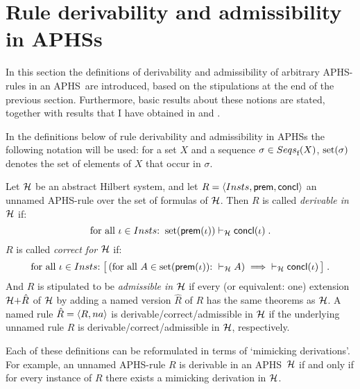\documentclass[envcountsame,runningheads]{llncs}
\newcommand{\pairlft}{{\langle}}
\newcommand{\pairrgt}{{\rangle}}
\newcommand{\pairsep}{{,\,}\nix}
\newcommand{\pairstr}[1]{\pairlft#1\pairrgt}
\newcommand{\pair}[2]{\pairstr{#1\pairsep#2}}
\newcommand{\triple}[2]{\pair{#1\pairsep#2}}
\newcommand{\finseqs}{\funap{{\mit Seqs}_{\text{f}}}}
\newcommand{\aseq}{\sigma}
\newcommand{\nix}{}
\newcommand{\funap}[2]{#1(#2)}
\newcommand{\APHS}{A\hspace*{-0.3pt}P\hspace*{-0.6pt}H\hspace*{-0.4pt}S}
\newcommand{\aAPHS}{{\cal H}}
\newcommand{\extsysbyrule}[2]{{{#1}{+}{#2}}}
\newcommand{\insts}{{\mit Insts}}
\newcommand{\ainst}{\iota}
\newcommand{\aname}{{\mit na}}
\newcommand{\anamedRule}{{\hat{R}}}
\newcommand{\aunnamedRule}{R}
\newcommand{\sprem}{{\sf prem}}
\newcommand{\sconcl}{{\sf concl}}
\newcommand{\prem}{\funap{\sprem}}
\newcommand{\concl}{\funap{\sconcl}}
\newcommand{\aform}{A}
\newcommand{\sconsrel}{\vdash}
\newcommand{\sconsrelH}[1]{{\sconsrel_{#1}}}
\newcommand{\consrelH}[3]{{#2 \mathrel{\sconsrelH{#1}} #3}}
\newcommand{\sset}{\text{\normalfont set}}
\newcommand{\set}{\funap{\sset}}
\begin{document}
\section{Rule derivability and admissibility in \APHS{s}}
  \label{sec:APHSs:results}



In this section the definitions of derivability and admissibility
of arbitrary \APHS-rules in an \APHS\ are introduced,
based on the stipulations at the end of the previous section.
Furthermore, basic results about these notions 
are stated, together with results that I have obtained
in \cite{grab:2003} and \cite{grab:2005}.

In the definitions below of rule derivability and admissibility in \APHS{s}
the following notation will be used:
for a set $X$ and a sequence $\aseq\in\finseqs{X}$, $\set{\aseq}$
denotes the set of elements of $X$ that occur in $\aseq$.

Let $\aAPHS$ be an abstract Hilbert system,
and let
$ \aunnamedRule = \triple{\insts}{\sprem}{\sconcl}$
an unnamed \APHS-rule over the set of formulas of $\aAPHS$.
Then $\aunnamedRule$ is called \emph{derivable in $\aAPHS$} if:
\begin{equation}
\text{for all $\ainst\in\insts$:} \;\;
    \consrelH{\aAPHS}{\set{\prem{\ainst}}}{\concl{\ainst}} \; .
\end{equation}
$\aunnamedRule$ is called \emph{correct for $\aAPHS$} if: 
\begin{equation}
\text{for all $\ainst\in\insts$:} \;
    \bigl[\,
    (\text{for all $\aform\in\set{\prem{\ainst}}$: 
     $\consrelH{\aAPHS}{\,}{\aform}$})
       \;\Longrightarrow\;
         \consrelH{\aAPHS}{}{\concl{\ainst}} 
    \,\bigr] \; .
\end{equation}
And $\aunnamedRule$ is stipulated to be \emph{admissible in $\aAPHS$} if
every (or equivalent: one)
extension $\extsysbyrule{\aAPHS}{\anamedRule}$ of $\aAPHS$
by adding a named version $\anamedRule$ of $\aunnamedRule$
has the same theorems as $\aAPHS$. 
A named rule $\anamedRule = \pair{\aunnamedRule}{\aname}$ 
is derivable/correct/admissible in $\aAPHS$
if the underlying unnamed rule $\aunnamedRule$ 
is derivable/correct/admissible in $\aAPHS$, respectively.

Each of these definitions can be reformulated in terms of `mimicking derivations'.
For example,
an unnamed \APHS-rule $\aunnamedRule$ is derivable in an \APHS~$\aAPHS$ 
if and only if
for every instance of $\aunnamedRule$ there exists a mimicking derivation
in $\aAPHS$.
\end{document}
